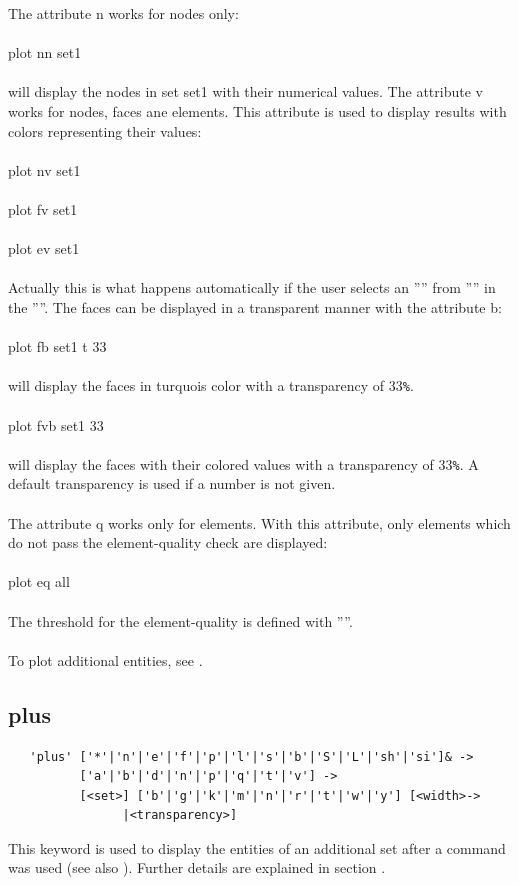 \documentclass{article}
\begin{document}
The attribute n works for nodes only:\\\\plot nn set1\\\\will display the nodes in set set1 with their numerical values. The attribute v works for nodes, faces ane elements. This attribute is used to display results with colors representing their values:\\\\plot nv set1\\\\plot fv set1\\\\plot ev set1\\\\Actually this is what happens automatically if the user selects an '''' from '''' in the ''''. The faces can be displayed in a transparent manner with the attribute b:\\\\plot fb set1 t 33\\\\will display the faces in turquois color with a transparency of 33\verb_%_.\\\\plot fvb set1 33\\\\will display the faces with their colored values with a transparency of 33\verb_%_. A default transparency is used if a number is not given.\\\\
The attribute q works only for elements. With this attribute, only elements which do not pass the element-quality check are displayed:\\\\
plot eq all\\\\ The threshold for the element-quality is defined with ''''.\\\\
To plot additional entities, see .

\subsection{\label{plus}plus}
\begin{verbatim}
   'plus' ['*'|'n'|'e'|'f'|'p'|'l'|'s'|'b'|'S'|'L'|'sh'|'si']& ->
          ['a'|'b'|'d'|'n'|'p'|'q'|'t'|'v'] ->
          [<set>] ['b'|'g'|'k'|'m'|'n'|'r'|'t'|'w'|'y'] [<width>->
                |<transparency>] 
\end{verbatim}
This keyword is used to display the entities of an additional set after a  command was used (see also ). Further details are explained in section .
\end{document}
